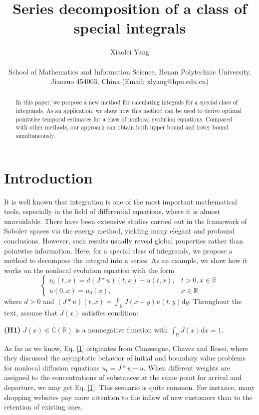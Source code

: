 \documentclass[12pt]{article}
\title{Series decomposition of a class of special integrals}
\author{%
	Xiaolei Yang
	\\[6pt]
	\begin{minipage}{\textwidth}
		\centering
		\small  
		School of Mathematics and Information Science, Henan Polytechnic University, Jiaozuo 454003, China (Email: xlyang@hpu.edu.cn)
	\end{minipage}
}
\date{}
\newcommand{\R}{\mathbb{R}}
\newcommand{\C}{\mathbb{C}}
\newcommand{\dd}{\mathrm{d}}
\begin{document}
\maketitle

\begin{abstract}
In this paper, we propose a new method for calculating integrals for a special class of integrands. As an application, we show how this method can be used to derive optimal pointwise temporal estimates for a class of nonlocal evolution equations. Compared with other methods, our approach can obtain both upper bound and lower bound simultaneously.
\end{abstract}

\section{Introduction}

  It is well known that integration is one of the most important mathematical tools, especially in the field of differential equations, where it is almost unavoidable. There have been extensive studies carried out in the framework of Sobolev spaces via the energy method, yielding many elegant and profound conclusions. However, such results usually reveal global properties rather than pointwise information. Here, for a special class of integrands, we propose a method to decompose the integral into a series. As an example, we show how it works on the nonlocal evolution equation with the form
\begin{equation}\label{1}
	\begin{cases}
		u_t(t,x) = d(J*u)(t,x) - u(t,x), & t > 0, x \in \mathbb{R} \\
		u(0,x) = u_0(x), & x \in \mathbb{R}
	\end{cases}
\end{equation}
where $d>0$ and \(\left( {J * u} \right)\left( {t,x} \right) = \int_{\mathbb{R}} {J\left( {x - y} \right)} u\left( {t,y} \right)\dd y.\) Throughout the text, assume that \(J(x)\) satisfies condition: 
\begin{flushleft}
	\textbf{(H1)} \(J(x)\in \C(\R)\) is a nonnegative function with \(\int_{\mathbb{R}} J(x) \dd x = 1\).
\end{flushleft} 

 As far as we know, Eq. \eqref{1} originates from Chasseigne, Chaves and Rossi\cite{Chasseigne2006}, where they discussed the asymptotic behavior of initial and boundary value problems for nonlocal diffusion equations $u_t = J*u - u.$ When different weights are assigned to the concentrations of substances at the same point for arrival and departure, we may get Eq. \eqref{1}. This scenario is quite common. For instance, many shopping websites pay more attention to the inflow of new customers than to the retention of existing ones.
\end{document}
